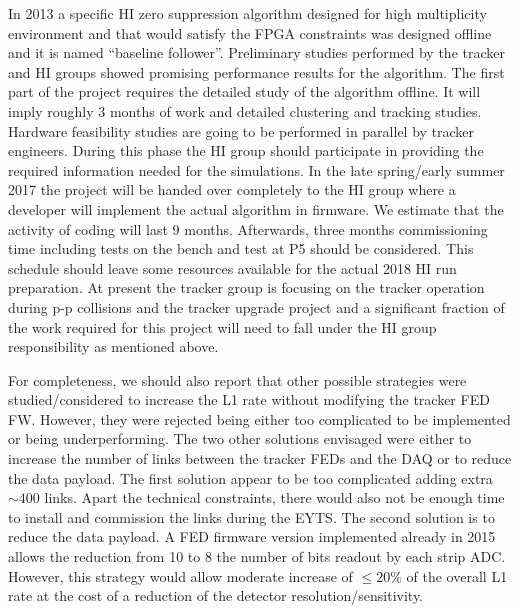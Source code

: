 In 2013 a specific HI zero suppression algorithm designed for high multiplicity environment and that would satisfy the FPGA constraints was designed offline and it is named “baseline follower”.  Preliminary studies performed by the tracker and HI groups showed promising performance results for the algorithm. The first part of the project requires the detailed study of the algorithm offline. It will imply roughly 3 months of work and detailed clustering and tracking studies. Hardware feasibility studies are going to be performed in parallel by tracker engineers. During this phase the HI group should participate in providing the required information needed for the simulations. In the late spring/early summer 2017 the project will be handed over completely to the HI group where a developer will implement the actual algorithm in firmware. We estimate that the activity of coding will last 9 months. Afterwards, three months commissioning time including tests on the bench and test at P5 should be considered. This schedule should leave some resources available for the actual 2018 HI run preparation. At present the tracker group is focusing on the tracker operation during p-p collisions and the tracker upgrade project and a significant fraction of the work required for this project will need to fall under the HI group responsibility as mentioned above. 


For completeness, we should also report that other possible strategies were studied/considered to increase the L1 rate without modifying the tracker FED FW. However, they were rejected being either too complicated to be implemented or being underperforming. The two other solutions envisaged were either to increase the number of links between the tracker FEDs and the DAQ or to reduce the data payload. The first solution appear to be too complicated adding extra $\sim 400$ links. Apart the technical constraints, there would also not be enough time to install and commission the links during the EYTS. The second solution is to reduce the data payload. A FED firmware version implemented already in 2015 allows the reduction from 10 to 8 the number of bits readout by each strip ADC. However, this strategy would allow moderate increase of $\le 20 \%$ of the overall L1 rate at the cost of a reduction of the detector resolution/sensitivity. 